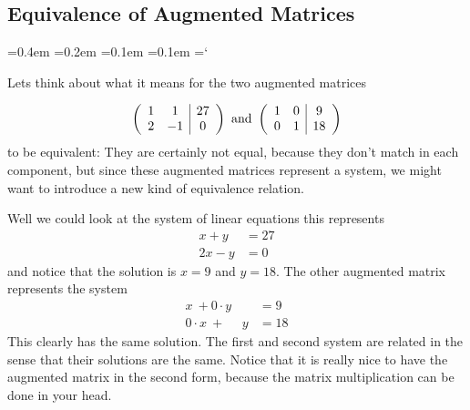 \subsection*{Equivalence of Augmented Matrices}

{\ttfamily
{}\font=0.4em
\font=0.2em
\font=0.1em
\font=0.1em
\hyphenchar\font=`\-


\hypertarget{script_gaussian_elimination_background}{Lets think about what it means for the two augmented matrices} 


\[ \left( \begin{array}{cc | c}
1 & 1 & 27 \\
2 & -1 & 0  
\end{array} \right)
\mbox{ and } \left( \begin{array}{cc | c}
1 & 0 & 9 \\
0 & 1 & 18  
\end{array} \right)
\]
to be equivalent:
They are certainly not equal, because they don't match in each component, but since these augmented matrices represent a system, we might want to introduce a new kind of equivalence relation.

Well we could look at the system of linear equations this represents 
\begin{align*}
 x+y &= 27\\
 2x - y &= 0
\end{align*}
and notice that the solution is $x=9$ and $y=18$. The other augmented matrix represents the system 
\begin{align*}
 x\ +0 \cdot y &= 9\\
 0 \cdot x \ +\   \phantom{0 \cdot} y  &= 18
\end{align*}
This clearly has the same solution. The first and second system are related in the sense that their solutions are the same. Notice that it is really nice to have the augmented matrix in the second form, because the matrix multiplication can be done in your head.


}

